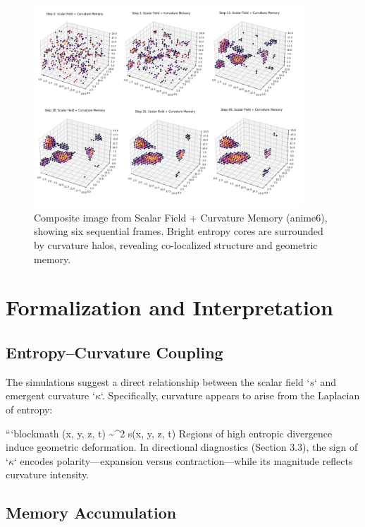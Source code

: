 \documentclass[12pt]{article}
\begin{document}
\begin{figure}[h]
    \centering
    \includegraphics[width=0.9\textwidth]{Figures/Figure_11.PNG}
    \caption{Composite image from Scalar Field + Curvature Memory (anime6), showing six sequential frames. Bright entropy cores are surrounded by curvature halos, revealing co-localized structure and geometric memory.}
    \label{fig:scalar_curvature_overlay}
\end{figure}

\section{Formalization and Interpretation}

\subsection{Entropy–Curvature Coupling}

The simulations suggest a direct relationship between the scalar field `\( s \)` and emergent curvature `\( \kappa \)`. Specifically, curvature appears to arise from the Laplacian of entropy:

```blockmath
\kappa(x, y, z, t) \sim \nabla^2 s(x, y, z, t)
Regions of high entropic divergence induce geometric deformation. In directional diagnostics (Section 3.3), the sign of `\( \kappa \)` encodes polarity—expansion versus contraction—while its magnitude reflects curvature intensity.

\subsection{Memory Accumulation}
\end{document}

